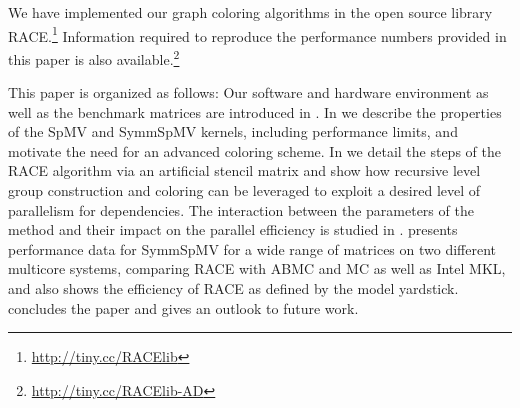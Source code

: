 \begin{itemize}
\end{itemize}
We have implemented our graph coloring algorithms in the open source library \acrfull{RACE}.\footnote{\href{http://tiny.cc/RACElib}{http://tiny.cc/RACElib}}
Information required to reproduce the performance numbers provided in this 
paper is also available.\footnote{\href{http://tiny.cc/RACElib-AD}{http://tiny.cc/RACElib-AD}}


This paper is organized as follows: Our software and hardware environment as well as
 the benchmark matrices are introduced in . 
In  we describe the properties
of the \acrshort{SpMV} and \acrshort{SymmSpMV} kernels, including
\roofline performance limits, and motivate the need for an advanced coloring scheme.
In  we detail the steps of the \acrshort{RACE} algorithm
via an artificial stencil matrix and show how recursive level group construction
and coloring can be leveraged to exploit a desired level of parallelism
for \DK dependencies. The interaction between the parameters of the method
and their impact on the parallel efficiency is studied in .
 presents performance data for \acrshort{SymmSpMV}
for a wide range of matrices on two different multicore systems,
comparing \acrshort{RACE} with \acrshort{ABMC} and \acrshort{MC} as well as
Intel MKL, and also shows the efficiency of \acrshort{RACE} as
defined by the \roofline model yardstick.
 concludes the paper and gives an outlook to
future work. 


